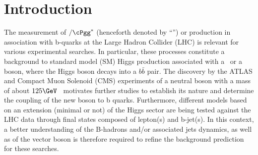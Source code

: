 \section{Introduction}
\label{sec:intro}

The measurement of \cPZ$/\cPgg^*$  (henceforth denoted by ``\cPZ'') or \Wpm production in association with b-quarks at the Large Hadron Collider (LHC) is relevant for various experimental searches. In particular, these processes constitute a background to standard model (SM) Higgs production associated with a  \cPZ~or a \Wpm boson, where the Higgs boson decays into a $b\bar{b}$ pair. The discovery by the ATLAS and Compact Muon Solenoid (CMS) experiments
of a neutral boson with a mass of about $125\GeV$~\cite{Aad20121,:2012gu} motivates further studies to establish its nature and determine the coupling of the new boson to b quarks. Furthermore, different models based on an extension (minimal or not) of the Higgs sector are being tested against the LHC data through final states composed of lepton(s) and b-jet(s).  In this context, a better understanding of the B-hadrons and/or associated jets dynamics, as well as of the vector boson is therefore required to refine the background prediction for these searches. 

